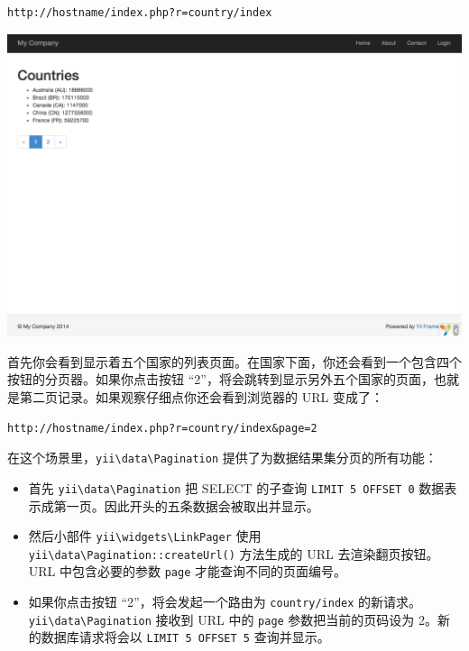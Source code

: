 \begin{lstlisting}
http://hostname/index.php?r=country/index
\end{lstlisting}
\noindent\includegraphics[width=\textwidth]{images/start-country-list.png}

首先你会看到显示着五个国家的列表页面。在国家下面，你还会看到一个包含四个按钮的分页器。如果你点击按钮 “2”，将会跳转到显示另外五个国家的页面，也就是第二页记录。如果观察仔细点你还会看到浏览器的 URL 变成了：

\begin{lstlisting}
http://hostname/index.php?r=country/index&page=2
\end{lstlisting}
在这个场景里，\texttt{yii{\allowbreak{}\textbackslash}data{\allowbreak{}\textbackslash}Pagination} 提供了为数据结果集分页的所有功能：

\begin{itemize}
\item 首先 \texttt{yii{\allowbreak{}\textbackslash}data{\allowbreak{}\textbackslash}Pagination} 把 SELECT 的子查询 \lstinline|LIMIT 5 OFFSET 0| 数据表示成第一页。因此开头的五条数据会被取出并显示。
\item 然后小部件 \texttt{yii{\allowbreak{}\textbackslash}widgets{\allowbreak{}\textbackslash}LinkPager} 使用 \texttt{yii{\allowbreak{}\textbackslash}data{\allowbreak{}\textbackslash}Pagination\allowbreak{}::\allowbreak{}createUrl()} 方法生成的 URL 去渲染翻页按钮。URL 中包含必要的参数 \lstinline|page| 才能查询不同的页面编号。
\item 如果你点击按钮 “2”，将会发起一个路由为 \lstinline|country/index| 的新请求。\texttt{yii{\allowbreak{}\textbackslash}data{\allowbreak{}\textbackslash}Pagination} 接收到 URL 中的 \lstinline|page| 参数把当前的页码设为 2。新的数据库请求将会以 \lstinline|LIMIT 5 OFFSET 5| 查询并显示。
\end{itemize}

